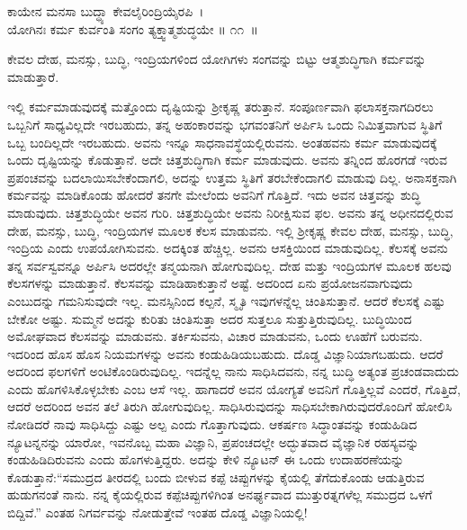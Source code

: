 \begin{shloka}
ಕಾಯೇನ ಮನಸಾ ಬುದ್ಧ್ಯಾ ಕೇವಲೈರಿಂದ್ರಿಯೈರಪಿ~।\\ಯೋಗಿನಃ ಕರ್ಮ ಕುರ್ವಂತಿ ಸಂಗಂ ತ್ಯಕ್ತ್ವಾತ್ಮಶುದ್ಧಯೇ \hfill॥ ೧೧~॥
\end{shloka}

\begin{artha}
ಕೇವಲ ದೇಹ, ಮನಸ್ಸು, ಬುದ್ಧಿ, ಇಂದ್ರಿಯಗಳಿಂದ ಯೋಗಿಗಳು ಸಂಗವನ್ನು ಬಿಟ್ಟು ಆತ್ಮಶುದ್ಧಿಗಾಗಿ ಕರ್ಮವನ್ನು ಮಾಡುತ್ತಾರೆ.
\end{artha}

ಇಲ್ಲಿ ಕರ್ಮಮಾಡುವುದಕ್ಕೆ ಮತ್ತೊಂದು ದೃಷ್ಟಿಯನ್ನು ಶ‍್ರೀಕೃಷ್ಣ ತರುತ್ತಾನೆ. ಸಂಪೂರ್ಣವಾಗಿ ಫಲಾಸಕ್ತನಾಗದಿರಲು ಒಬ್ಬನಿಗೆ ಸಾಧ್ಯವಿಲ್ಲದೇ ಇರಬಹುದು, ತನ್ನ ಅಹಂಕಾರವನ್ನು ಭಗವಂತನಿಗೆ ಅರ್ಪಿಸಿ ಒಂದು ನಿಮಿತ್ತವಾಗುವ ಸ್ಥಿತಿಗೆ ಒಬ್ಬ ಬಂದಿಲ್ಲದೇ ಇರಬಹುದು. ಅವನು ಇನ್ನೂ ಸಾಧನಾವಸ್ಥೆಯಲ್ಲಿರುವನು. ಅಂತಹವನು ಕರ್ಮ ಮಾಡುವುದಕ್ಕೆ ಒಂದು ದೃಷ್ಟಿಯನ್ನು ಕೊಡುತ್ತಾನೆ. ಅದೇ ಚಿತ್ತಶುದ್ಧಿಗಾಗಿ ಕರ್ಮ ಮಾಡುವುದು. ಅವನು ತನ್ನಿಂದ ಹೊರಗಡೆ ಇರುವ ಪ್ರಪಂಚವನ್ನು ಬದಲಾಯಿಸಬೇಕೆಂದಾಗಲಿ, ಅದನ್ನು ಉತ್ತಮ ಸ್ಥಿತಿಗೆ ತರಬೇಕೆಂದಾಗಲಿ ಮಾಡುವು ದಿಲ್ಲ. ಅನಾಸಕ್ತನಾಗಿ ಕರ್ಮವನ್ನು ಮಾಡಿಕೊಂಡು ಹೋದರೆ ತನಗೇ ಮೇಲೆಂದು ಅವನಿಗೆ ಗೊತ್ತಿದೆ. ಇದು ಅವನ ಚಿತ್ತವನ್ನು ಶುದ್ಧಿ ಮಾಡುವುದು. ಚಿತ್ತಶುದ್ಧಿಯೇ ಅವನ ಗುರಿ. ಚಿತ್ತಶುದ್ಧಿಯೇ ಅವನು ನಿರೀಕ್ಷಿಸುವ ಫಲ. ಅವನು ತನ್ನ ಅಧೀನದಲ್ಲಿರುವ ದೇಹ, ಮನಸ್ಸು, ಬುದ್ಧಿ, ಇಂದ್ರಿಯಗಳ ಮೂಲಕ ಕೆಲಸ ಮಾಡುವನು. ಇಲ್ಲಿ ಶ‍್ರೀಕೃಷ್ಣ ಕೇವಲ ದೇಹ, ಮನಸ್ಸು, ಬುದ್ಧಿ, ಇಂದ್ರಿಯ ಎಂದು ಉಪಯೋಗಿಸುವನು. ಅದಕ್ಕಿಂತ ಹೆಚ್ಚಿಲ್ಲ. ಅವನು ಆಸಕ್ತಿಯಿಂದ ಮಾಡುವುದಿಲ್ಲ. ಕೆಲಸಕ್ಕೆ ಅವನು ತನ್ನ ಸರ್ವಸ್ವವನ್ನೂ ಅರ್ಪಿಸಿ ಅದರಲ್ಲೇ ತನ್ಮಯನಾಗಿ ಹೋಗುವುದಿಲ್ಲ. ದೇಹ ಮತ್ತು ಇಂದ್ರಿಯಗಳ ಮೂಲಕ ಹಲವು ಕೆಲಸಗಳನ್ನು ಮಾಡುತ್ತಾನೆ. ಕೆಲಸವನ್ನು ಮಾಡಿಹಾಕುತ್ತಾನೆ ಅಷ್ಟೆ. ಅದರಿಂದ ಏನು ಪ್ರಯೋಜನವಾಗುವುದು ಎಂಬುದನ್ನು ಗಮನಿಸುವುದೇ ಇಲ್ಲ. ಮನಸ್ಸಿನಿಂದ ಕಲ್ಪನೆ, ಸ್ಮೃತಿ ಇವುಗಳನ್ನೆಲ್ಲ ಚಿಂತಿಸುತ್ತಾನೆ. ಆದರೆ ಕೆಲಸಕ್ಕೆ ಎಷ್ಟು ಬೇಕೋ ಅಷ್ಟು. ಸುಮ್ಮನೆ ಅದನ್ನು ಕುರಿತು ಚಿಂತಿಸುತ್ತಾ ಅದರ ಸುತ್ತಲೂ ಸುತ್ತುತ್ತಿರುವುದಿಲ್ಲ. ಬುದ್ಧಿಯಿಂದ ಅಮೋಘವಾದ ಕೆಲಸವನ್ನು ಮಾಡುವನು. ತರ್ಕಿಸುವನು, ವಿಚಾರ ಮಾಡುವನು, ಒಂದು ಊಹೆಗೆ ಬರುವನು. ಇದರಿಂದ ಹೊಸ ಹೊಸ ನಿಯಮಗಳನ್ನು ಅವನು ಕಂಡುಹಿಡಿಯಬಹುದು. ದೊಡ್ಡ ವಿಜ್ಞಾನಿಯಾಗಬಹುದು. ಆದರೆ ಅದರಿಂದ ಫಲಗಳಿಗೆ ಅಂಟಿಕೊಂಡಿರುವುದಿಲ್ಲ. ಇದನ್ನೆಲ್ಲ ನಾನು ಸಾಧಿಸಿದವನು, ನನ್ನ ಬುದ್ಧಿ ಅತ್ಯಂತ ಪ್ರಚಂಡವಾದುದು ಎಂದು ಹೊಗಳಿಸಿಕೊಳ್ಳಬೇಕು ಎಂಬ ಆಸೆ ಇಲ್ಲ. ಹಾಗಾದರೆ ಅವನ ಯೋಗ್ಯತೆ ಅವನಿಗೆ ಗೊತ್ತಿಲ್ಲವೆ ಎಂದರೆ, ಗೊತ್ತಿದೆ, ಆದರೆ ಅದರಿಂದ ಅವನ ತಲೆ ತಿರುಗಿ ಹೋಗುವುದಿಲ್ಲ. ಸಾಧಿಸಿರುವುದನ್ನು ಸಾಧಿಸಬೇಕಾಗಿರುವುದರೊಂದಿಗೆ ಹೋಲಿಸಿ ನೋಡಿದರೆ ನಾವು ಸಾಧಿಸಿದ್ದು ಎಷ್ಟು ಅಲ್ಪ ಎಂದು ಗೊತ್ತಾಗುವುದು. ಆಕರ್ಷಣ ಸಿದ್ಧಾಂತವನ್ನು ಕಂಡುಹಿಡಿದ ನ್ಯೂಟನ್ನನನ್ನು ಯಾರೋ, ಇವನೊಬ್ಬ ಮಹಾ ವಿಜ್ಞಾನಿ, ಪ್ರಪಂಚದಲ್ಲೇ ಅದ್ಭುತವಾದ ವೈಜ್ಞಾನಿಕ ರಹಸ್ಯವನ್ನು ಕಂಡುಹಿಡಿದಿರುವನು ಎಂದು ಹೊಗಳುತ್ತಿದ್ದರು. ಅದನ್ನು ಕೇಳಿ ನ್ಯೂಟನ್ ಈ ಒಂದು ಉದಾಹರಣೆಯನ್ನು ಕೊಡುತ್ತಾನೆ:“ಸಮುದ್ರದ ತೀರದಲ್ಲಿ ಬಂದು ಬೀಳುವ ಕಪ್ಪೆ ಚಿಪ್ಪುಗಳನ್ನು ಕೈಯಲ್ಲಿ ತೆಗೆದುಕೊಂಡು ಆಡುತ್ತಿರುವ ಹುಡುಗನಂತೆ ನಾನು. ನನ್ನ ಕೈಯಲ್ಲಿರುವ ಕಪ್ಪೆಚಿಪ್ಪುಗಳಿಗಿಂತ ಅನರ್ಘ್ಯವಾದ ಮುತ್ತುರತ್ನಗಳೆಲ್ಲ ಸಮುದ್ರದ ಒಳಗೆ ಬಿದ್ದಿವೆ.” ಎಂತಹ ನಿಗರ್ವವನ್ನು ನೋಡುತ್ತೇವೆ ಇಂತಹ ದೊಡ್ಡ ವಿಜ್ಞಾನಿಯಲ್ಲಿ!

